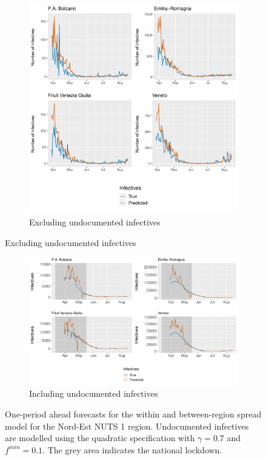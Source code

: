 \documentclass[12pt]{article}
\begin{document}
\begin{appendices}
		\begin{figure}[H]
    	    \centering
    	    \begin{subfigure}{\textwidth}
    	      \centering
    	      \includegraphics[width=0.94\linewidth]{output/model_between_lag14_forecast_start20_Nord-Est_rolling.pdf}
    	      \caption{Excluding undocumented infectives}
    	      \label{fig:forecast_between_nordest_regular}
    	    \end{subfigure}
        \end{figure}
        \begin{figure}[H]\ContinuedFloat
    	    \begin{subfigure}{\textwidth}
    	      \centering
    	      \includegraphics[width=0.94\linewidth]{output/model_between_lag14_forecast_start20_Nord-Est_UndocQuadratic_rolling.pdf}
    	      \caption{Including undocumented infectives}
    	      \label{fig:forecast_between_nordest_undoc}
    	    \end{subfigure}
    	    \caption{One-period ahead forecasts for the within and between-region spread model for the Nord-Est NUTS 1 region. Undocumented infectives are modelled using the quadratic specification with $\gamma = 0.7$ and $f^{min}=0.1$. The grey area indicates the national lockdown.}
    	    \label{fig:forecast_between_nordest}
        \end{figure}
        

\end{appendices}
\end{document}
